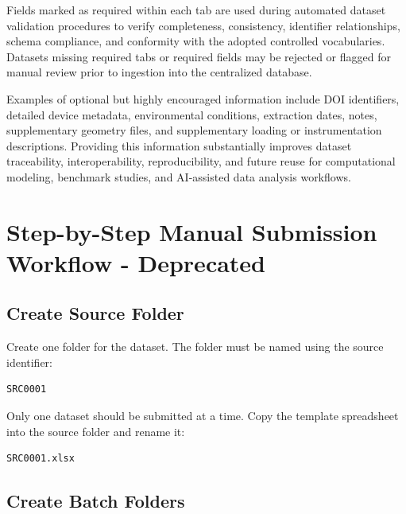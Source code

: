 \documentclass[11pt]{book}
\begin{document}
Fields marked as required within each tab are used during automated dataset validation procedures to verify completeness, consistency, identifier relationships, schema compliance, and conformity with the adopted controlled vocabularies. Datasets missing required tabs or required fields may be rejected or flagged for manual review prior to ingestion into the centralized database.

Examples of optional but highly encouraged information include DOI identifiers, detailed device metadata, environmental conditions, extraction dates, notes, supplementary geometry files, and supplementary loading or instrumentation descriptions. Providing this information substantially improves dataset traceability, interoperability, reproducibility, and future reuse for computational modeling, benchmark studies, and AI-assisted data analysis workflows.



\newpage

\chapter{Step-by-Step Manual Submission Workflow - Deprecated}

\section{Create Source Folder}

Create one folder for the dataset. The folder must be named using the source identifier:

\begin{verbatim}
SRC0001
\end{verbatim}

Only one dataset should be submitted at a time. Copy the template spreadsheet into the source folder and rename it:

\begin{verbatim}
SRC0001.xlsx
\end{verbatim}


\section{Create Batch Folders}
\end{document}
